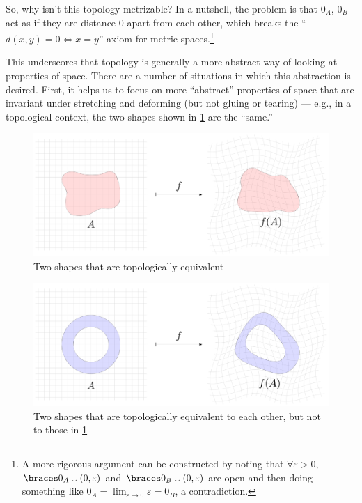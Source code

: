 \documentclass{fkpaper}
\begin{document}
\begin{multicols}{2}
So, why isn't this topology metrizable? In a nutshell, the problem is
that $0_A$, $0_B$ act as if they are distance $0$ apart from each
other, which breaks the ``$d(x,y) = 0 \iff x = y$'' axiom for metric
spaces.\footnote{A more rigorous argument can be constructed by noting
  that $\forall \varepsilon > 0$, $\set{0_A} \cup (0,\varepsilon)$ and
  $\set{0_B} \cup (0, \varepsilon)$ are open and then doing something
  like $0_A = \lim_{\varepsilon \to 0} \varepsilon = 0_B$, a
  contradiction.}

This underscores that topology is generally a more abstract way of
looking at properties of space. There are a number of situations in
which this abstraction is desired. First, it helps us to focus on
more ``abstract'' properties of space that are invariant under
stretching and deforming (but not gluing or tearing) --- e.g., in a
topological context, the two shapes shown in \cref{fig:deform-grid}
are the ``same.''
\end{multicols}
\begin{figure}[H]
  \centering
  \includegraphics[scale=.325, angle=0]{figures/deform-grid.pdf}
  \caption{Two shapes that are topologically equivalent}
  \label{fig:deform-grid}
\end{figure}
\begin{figure}[H]
  \centering
  \includegraphics[scale=.325, angle=0]{figures/deform-grid-annulus.pdf}
  \caption{Two shapes that are topologically equivalent to each other,
    but not to those in \cref{fig:deform-grid}}
  \label{fig:deform-annulus}
\end{figure}
\end{document}
